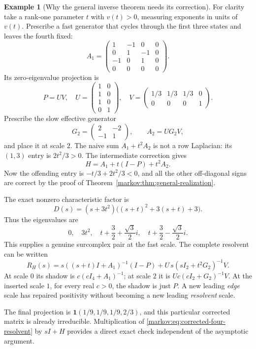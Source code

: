 \documentclass[11pt]{article}
\numberwithin{equation}{section}
\theoremstyle{definition}
\newtheorem{example}[theorem]{Example}
\theoremstyle{remark}
\newcommand{\one}{\mathbf 1}
\begin{document}
\begin{example}[Why the general inverse theorem needs its correction]
\label{markov:ex:prescribed}
For clarity take a rank-one parameter $t$ with $v(t)>0$, measuring exponents in
units of $v(t)$. Prescribe a fast generator that cycles through the first three
states and leaves the fourth fixed:
\[
 A_1=\begin{pmatrix}
 1&-1&0&0\\0&1&-1&0\\-1&0&1&0\\0&0&0&0
 \end{pmatrix}.
\]
Its zero-eigenvalue projection is
\[
 P=UV,\quad
 U=\begin{pmatrix}1&0\\1&0\\1&0\\0&1\end{pmatrix},\quad
 V=\begin{pmatrix}1/3&1/3&1/3&0\\0&0&0&1\end{pmatrix}.
\]
Prescribe the slow effective generator
\[
 G_2=\begin{pmatrix}2&-2\\-1&1\end{pmatrix},\qquad A_2=UG_2V,
\]
and place it at scale $2$. The naive sum $A_1+t^2A_2$ is not a row Laplacian:
its $(1,3)$ entry is $2t^2/3>0$. The intermediate correction gives
\begin{equation}\label{markov:eq:corrected-four}
 H=A_1+t(I-P)+t^2A_2.
\end{equation}
Now the offending entry is $-t/3+2t^2/3<0$, and all the other off-diagonal signs
are correct by the proof of Theorem~\ref{markov:thm:general-realization}.

The exact nonzero characteristic factor is
\begin{equation}\label{markov:eq:corrected-four-char}
 D(s)=(s+3t^2)\bigl((s+t)^2+3(s+t)+3\bigr).
\end{equation}
Thus the eigenvalues are
\[
 0,\quad 3t^2,\quad
 t+\frac32+\frac{\sqrt3}{2}i,\quad
 t+\frac32-\frac{\sqrt3}{2}i.
\]
This supplies a genuine surcomplex pair at the fast scale. The complete
resolvent can be written
\begin{equation}\label{markov:eq:corrected-four-resolvent}
 R_H(s)=s((s+t)I+A_1)^{-1}(I-P)
       +U\,s(sI_2+t^2G_2)^{-1}V.
\end{equation}
At scale $0$ its shadow is $c(cI_4+A_1)^{-1}$; at scale $2$ it is
$U c(cI_2+G_2)^{-1}V$. At the inserted scale $1$, for every real $c>0$, the
shadow is just $P$. A new leading \emph{edge} scale has repaired positivity
without becoming a new leading \emph{resolvent} scale.

The final projection is
$\one(1/9,1/9,1/9,2/3)$, and this particular corrected matrix is already
irreducible. Multiplication of \eqref{markov:eq:corrected-four-resolvent} by $sI+H$
provides a direct exact check independent of the asymptotic argument.
\end{example}
\end{document}
